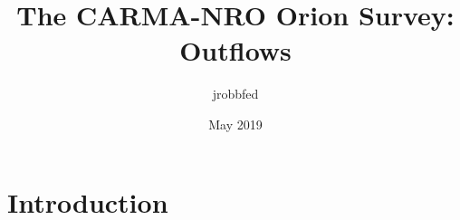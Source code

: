 \documentclass{article}
\title{The CARMA-NRO Orion Survey: Outflows}
\author{jrobbfed }
\date{May 2019}
\begin{document}
\maketitle

\section{Introduction}
\end{document}
